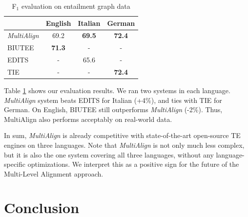 \documentclass[11pt,letterpaper]{article}
\begin{document}
\begin{table}[t!]
\centering
\small
\begin{tabular}{l|ccc}
              &   English    &   Italian   &  German  \\
\hline
{\em MultiAlign}&   69.2     &   \textbf{69.5}    &   \textbf{72.4}  \\
BIUTEE        &   \textbf{71.3}     &     -       &     -     \\
EDITS         &      -       &   65.6    &     -     \\
TIE           &      -       &     -       &   \textbf{72.4}  \\ 
\end{tabular}
\caption{F$_1$ evaluation on entailment graph data}
\label{table:egraph}
\end{table}

Table \ref{table:egraph} shows our evaluation results. We ran two
systems in each language. {\it MultiAlign} system beats EDITS for
Italian (+4\%), and ties with TIE for German. On English, BIUTEE still
outperforms {\it MultiAlign} (-2\%). Thus, MultiAlign also performs
acceptably on real-world data.

 In sum,
{\it MultiAlign} is already competitive with state-of-the-art
open-source TE engines on three languages.   
Note that {\it MultiAlign} is not only much less complex, but it is
also the one system covering all three languages, without any
language-specific optimizations. We interpret this as a positive sign
for the future of the Multi-Level Alignment approach. 

\section{Conclusion}
\end{document}
